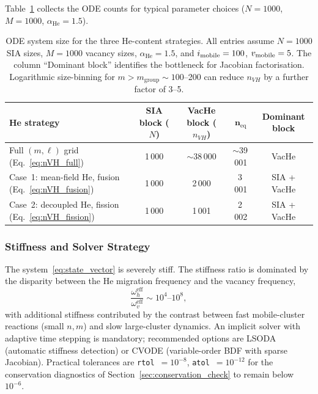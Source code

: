\documentclass[pdflatex,sn-basic]{sn-jnl} %
\begin{document}
Table~\ref{tab:system_size} collects the ODE counts for typical
parameter choices ($N = 1000$, $M = 1000$, $\alpha_{\mathrm{He}} = 1.5$).

\begin{table}[htbp]
\centering
\caption{ODE system size for the three He-content strategies. All
entries assume $N = 1000$ SIA sizes, $M = 1000$ vacancy sizes,
$\alpha_{\mathrm{He}} = 1.5$, and $i_{\rm mobile} = 100$, $v_{\rm mobile} = 5$.
The column ``Dominant block'' identifies the bottleneck for
Jacobian factorisation. Logarithmic size-binning for
$m > m_{\mathrm{group}} \sim 100$--200 can reduce $n_{VH}$ by a further
factor of 3--5.}
\label{tab:system_size}
\renewcommand{\arraystretch}{1.25}
\begin{tabular}{@{}lcccc@{}}
\toprule
\textbf{He strategy} & \textbf{SIA block ($N$)}
  & \textbf{VacHe block ($n_{VH}$)}
  & $\mathbf{n_{\mathrm{eq}}}$
  & \textbf{Dominant block} \\
\midrule
Full $(m,\ell)$ grid (Eq.~\ref{eq:nVH_full})
  & 1\,000 & $\sim$38\,000 & $\sim$39\,001 & VacHe \\
Case~1: mean-field He, fusion (Eq.~\ref{eq:nVH_fusion})
  & 1\,000 & 2\,000 & 3\,001 & SIA + VacHe \\
Case~2: decoupled He, fission (Eq.~\ref{eq:nVH_fission})
  & 1\,000 & 1\,001 & 2\,002 & SIA + VacHe \\
\bottomrule
\end{tabular}
\end{table}

\subsubsection{Stiffness and Solver Strategy}
\label{sec:solver}

The system~\eqref{eq:state_vector} is severely stiff. The stiffness
ratio is dominated by the disparity between the He migration frequency
and the vacancy frequency,
\begin{equation}\label{eq:stiffness}
    \frac{\omega_h^{\mathrm{eff}}}{\omega_v^{\mathrm{eff}}}
    \sim 10^4\text{--}10^8,
\end{equation}
with additional stiffness contributed by the contrast between
fast mobile-cluster reactions (small $n,m$) and slow large-cluster
dynamics. An implicit solver with adaptive time stepping is mandatory;
recommended options are LSODA (automatic stiffness detection) or CVODE
(variable-order BDF with sparse Jacobian). Practical tolerances are
\texttt{rtol}~$= 10^{-8}$, \texttt{atol}~$= 10^{-12}$ for the
conservation diagnostics of Section~\ref{sec:conservation_check} to
remain below $10^{-6}$.
\end{document}
